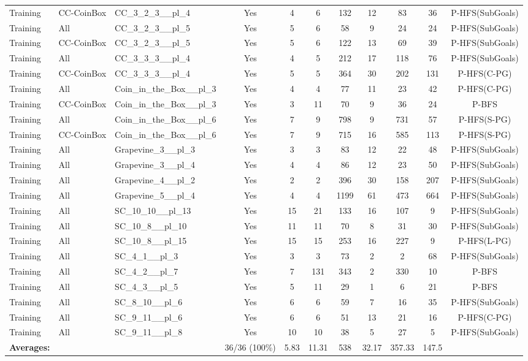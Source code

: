 \documentclass{article}
\begin{document}
\begin{tabular}{lllcccccccc}
Training & CC-CoinBox & CC\_3\_2\_3\_\_pl\_4 & Yes & 4 & 6 & 132 & 12 & 83 & 36 & P-HFS(SubGoals) \\
Training & All & CC\_3\_2\_3\_\_pl\_5 & Yes & 5 & 6 & 58 & 9 & 24 & 24 & P-HFS(SubGoals) \\
Training & CC-CoinBox & CC\_3\_2\_3\_\_pl\_5 & Yes & 5 & 6 & 122 & 13 & 69 & 39 & P-HFS(SubGoals) \\
Training & All & CC\_3\_3\_3\_\_pl\_4 & Yes & 4 & 5 & 212 & 17 & 118 & 76 & P-HFS(SubGoals) \\
Training & CC-CoinBox & CC\_3\_3\_3\_\_pl\_4 & Yes & 5 & 5 & 364 & 30 & 202 & 131 & P-HFS(C-PG) \\
Training & All & Coin\_in\_the\_Box\_\_pl\_3 & Yes & 4 & 4 & 77 & 11 & 23 & 42 & P-HFS(C-PG) \\
Training & CC-CoinBox & Coin\_in\_the\_Box\_\_pl\_3 & Yes & 3 & 11 & 70 & 9 & 36 & 24 & P-BFS \\
Training & All & Coin\_in\_the\_Box\_\_pl\_6 & Yes & 7 & 9 & 798 & 9 & 731 & 57 & P-HFS(S-PG) \\
Training & CC-CoinBox & Coin\_in\_the\_Box\_\_pl\_6 & Yes & 7 & 9 & 715 & 16 & 585 & 113 & P-HFS(S-PG) \\
Training & All & Grapevine\_3\_\_pl\_3 & Yes & 3 & 3 & 83 & 12 & 22 & 48 & P-HFS(SubGoals) \\
Training & All & Grapevine\_3\_\_pl\_4 & Yes & 4 & 4 & 86 & 12 & 23 & 50 & P-HFS(SubGoals) \\
Training & All & Grapevine\_4\_\_pl\_2 & Yes & 2 & 2 & 396 & 30 & 158 & 207 & P-HFS(SubGoals) \\
Training & All & Grapevine\_5\_\_pl\_4 & Yes & 4 & 4 & 1199 & 61 & 473 & 664 & P-HFS(SubGoals) \\
Training & All & SC\_10\_10\_\_pl\_13 & Yes & 15 & 21 & 133 & 16 & 107 & 9 & P-HFS(SubGoals) \\
Training & All & SC\_10\_8\_\_pl\_10 & Yes & 11 & 11 & 70 & 8 & 31 & 30 & P-HFS(SubGoals) \\
Training & All & SC\_10\_8\_\_pl\_15 & Yes & 15 & 15 & 253 & 16 & 227 & 9 & P-HFS(L-PG) \\
Training & All & SC\_4\_1\_\_pl\_3 & Yes & 3 & 3 & 73 & 2 & 2 & 68 & P-HFS(SubGoals) \\
Training & All & SC\_4\_2\_\_pl\_7 & Yes & 7 & 131 & 343 & 2 & 330 & 10 & P-BFS \\
Training & All & SC\_4\_3\_\_pl\_5 & Yes & 5 & 11 & 29 & 1 & 6 & 21 & P-BFS \\
Training & All & SC\_8\_10\_\_pl\_6 & Yes & 6 & 6 & 59 & 7 & 16 & 35 & P-HFS(SubGoals) \\
Training & All & SC\_9\_11\_\_pl\_6 & Yes & 6 & 6 & 51 & 13 & 21 & 16 & P-HFS(C-PG) \\
Training & All & SC\_9\_11\_\_pl\_8 & Yes & 10 & 10 & 38 & 5 & 27 & 5 & P-HFS(SubGoals) \\
\textbf{Averages:} & & & 36/36 (100\%) & 5.83 & 11.31 & 538 & 32.17 & 357.33 & 147.5 & \\
\bottomrule
\end{tabular}
\newpage
\end{document}
